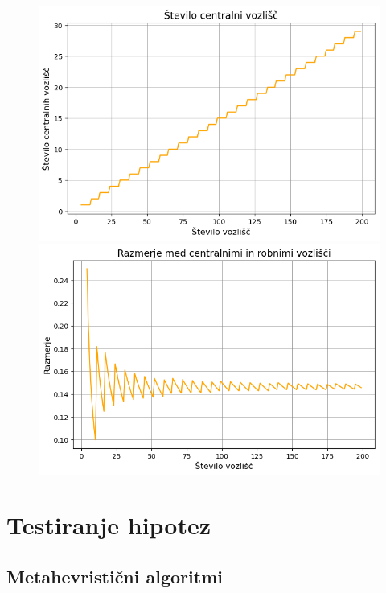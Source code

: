 \documentclass[a4paper,12pt]{article}
\begin{document}
\begin{figure}[h!]
      \includegraphics[width=\textwidth]{graf_st_centralnih.png}
      \includegraphics[width=\textwidth]{graf_razmerje_med_centralnimi_in_robnimi.png}
\end{figure}


\section{Testiranje hipotez}
\subsection{Metahevristični algoritmi}
\end{document}
